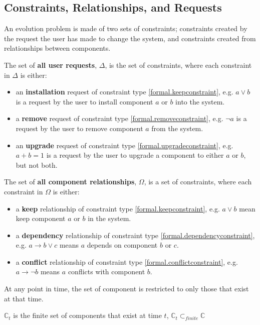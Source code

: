 \subsection{Constraints, Relationships, and Requests}
\label{formal.constraints}
An evolution problem is made of two sets of constraints; constraints created by the request the user has made to change the system, 
and constraints created from relationships between components.

\begin{defs}
The set of \textbf{all user requests}, $\Delta$, is the set of constraints, 
where each constraint in $\Delta$ is either:
\begin{itemize}
  \item an \textbf{installation} request of constraint type \ref{formal.keepconstraint}, e.g. $a \vee b$ is a request by the user to install component $a$ or $b$ into the system.
  \item a \textbf{remove} request of constraint type \ref{formal.removeconstraint}, e.g. $\neg a$ is a request by the user to remove component $a$ from the system.
  \item an \textbf{upgrade} request of constraint type \ref{formal.upgradeconstraint}, e.g. $a + b = 1$ is a request by the user to upgrade a component to either $a$ or $b$, but not both.
\end{itemize}
\end{defs}


\begin{defs}
The set of \textbf{all component relationships}, $\Omega$, is a set of constraints,
where each constraint in $\Omega$ is either: 
\begin{itemize}
  \item a \textbf{keep} relationship of constraint type \ref{formal.keepconstraint}, e.g.  $a \vee b$ mean keep component $a$ or $b$ in the system.
  \item a \textbf{dependency} relationship of constraint type \ref{formal.dependencyconstraint}, e.g.  $a \rightarrow b \vee c$ means $a$ depends on component $b$ or $c$.
  \item a \textbf{conflict} relationship of constraint type \ref{formal.conflictconstraint},  e.g. $a \rightarrow \neg b$ means $a$ conflicts with component $b$.
\end{itemize}
\end{defs}

At any point in time, the set of component is restricted to only those that exist at that time. 
\begin{defs}
$\mathbb{C}_t$ is the finite set of components that exist at time $t$, $\mathbb{C}_t \subset_{finite} \mathbb{C}$
\end{defs}

